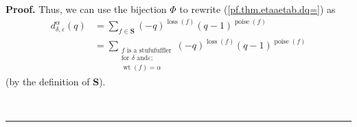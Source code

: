 \documentclass[numbers=enddot,12pt,final,onecolumn,notitlepage]{scrartcl}%
\theoremstyle{definition}
\newenvironment{proof}[1][Proof]{\noindent\textbf{#1.} }{\ \rule{0.5em}{0.5em}}
\let\sumnonlimits\sum
\renewcommand{\sum}{\sumnonlimits\limits}
\begin{document}
\begin{proof}
Thus, we can use the bijection $\Phi$ to rewrite (\ref{pf.thm.etaaetab.dq=})
as%
\begin{align}
d_{\delta,\varepsilon}^{\alpha}\left(  q\right)   &  =\sum_{f\in\mathbf{S}%
}\left(  -q\right)  ^{\operatorname*{loss}\left(  f\right)  }\left(
q-1\right)  ^{\operatorname*{poise}\left(  f\right)  }\nonumber\\
&  =\sum_{\substack{f\text{ is a stufufuffler}\\\text{for }\delta\text{ and
}\varepsilon;\\\operatorname*{wt}\left(  f\right)  =\alpha}}\left(  -q\right)
^{\operatorname*{loss}\left(  f\right)  }\left(  q-1\right)
^{\operatorname*{poise}\left(  f\right)  } \label{pf.thm.etaaetab.dq=stuf}%
\end{align}
(by the definition of $\mathbf{S}$).


\end{proof}
\end{document}
